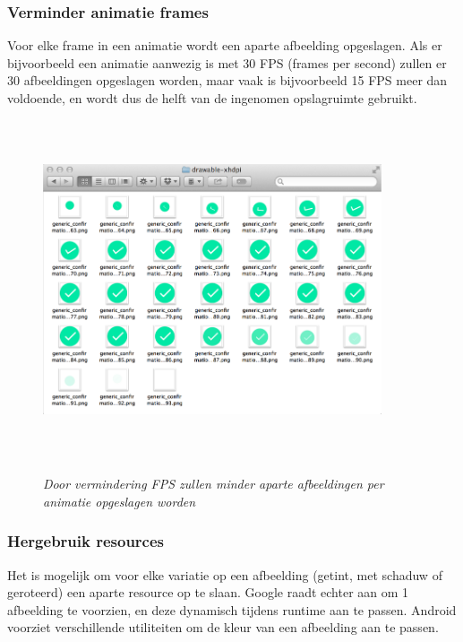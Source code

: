 \subsubsection{Verminder animatie frames }
\label{sec:reduceanimationframes}
Voor elke frame in een animatie wordt een aparte afbeelding opgeslagen. Als er bijvoorbeeld een animatie aanwezig is met 30 FPS (frames per second) zullen er 30 afbeeldingen opgeslagen worden, maar vaak is bijvoorbeeld 15 FPS meer dan voldoende, en wordt dus de helft van de ingenomen opslagruimte gebruikt.
\begin{figure}[H]
	\centering
	\caption{\textit{Door vermindering FPS zullen minder aparte afbeeldingen per animatie opgeslagen worden}\newline}
	\includegraphics[width=10cm, height=10cm, keepaspectratio]{img/animation-frames}\\[.5cm]
	
\end{figure}
\subsubsection{Hergebruik resources }
\label{sec:reuseresources}
Het is mogelijk om voor elke variatie op een afbeelding (getint, met schaduw of geroteerd) een aparte resource op te slaan. Google raadt echter aan om 1 afbeelding te voorzien, en deze dynamisch tijdens runtime aan te passen. 
Android voorziet verschillende utiliteiten om de kleur van een afbeelding aan te passen.
